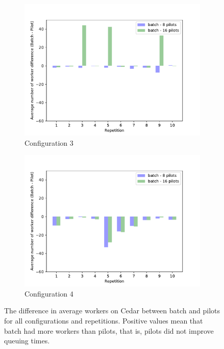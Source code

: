 \begin{figure}
\begin{subfigure}[b]{0.475\textwidth}
		\centering
		\includegraphics[width=\textwidth]{figures/part2-chp2/nworkers_3_cedar}
		\caption[]%
		{{\small Configuration 3}}
		\label{fig:nwcedar3}
	    \end{subfigure}
	    \quad
	    \begin{subfigure}[b]{0.475\textwidth}
		\centering
		\includegraphics[width=\textwidth]{figures/part2-chp2/nworkers_4_cedar}
		\caption[]%
		{{\small Configuration 4}}
		\label{fig:nwcedar4}
	    \end{subfigure}
	    \caption{\small The difference in average workers on Cedar between batch and pilots for all configurations and repetitions. Positive values mean
	    that batch had more workers than pilots, that is, pilots did not improve queuing times.}
	    \label{fig:nworkerscedar}
	\end{figure}
    
